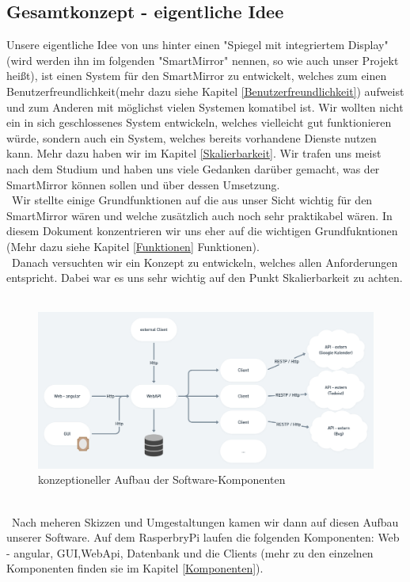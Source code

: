 \subsection{Gesamtkonzept - eigentliche Idee} 
Unsere eigentliche Idee von uns hinter einen "Spiegel mit integriertem Display" (wird werden ihn im folgenden "SmartMirror" nennen, so wie auch unser Projekt heißt), ist einen System für den SmartMirror zu entwickelt, welches zum einen Benutzerfreundlichkeit(mehr dazu siehe Kapitel \ref{Benutzerfreundlichkeit}) aufweist und zum Anderen mit möglichst vielen Systemen komatibel ist. Wir wollten nicht ein in sich geschlossenes System entwickeln, welches vielleicht gut funktionieren würde, sondern auch ein System, welches bereits vorhandene Dienste nutzen kann. Mehr dazu haben wir im Kapitel \ref{Skalierbarkeit}.
Wir trafen uns meist nach dem Studium und haben uns viele Gedanken darüber gemacht, was der SmartMirror können sollen und über dessen Umsetzung. \\\
Wir stellte einige Grundfunktionen auf die aus unser Sicht wichtig für den SmartMirror wären und welche zusätzlich auch noch sehr praktikabel wären. In diesem Dokument konzentrieren wir uns eher auf die wichtigen Grundfukntionen (Mehr dazu siehe Kapitel \ref{Funktionen} Funktionen).\\\
Danach versuchten wir ein Konzept zu entwickeln, welches allen Anforderungen entspricht. Dabei war es uns sehr wichtig auf den Punkt Skalierbarkeit zu achten.\\\
\begin{figure}[h]
\centering
\includegraphics[width=150mm]{pictures/Scalability.png}
\caption{konzeptioneller Aufbau der Software-Komponenten}
\end{figure}\\\
Nach meheren Skizzen und Umgestaltungen kamen wir dann auf diesen Aufbau unserer Software. Auf dem RasperbryPi laufen die folgenden Komponenten: Web - angular, GUI,WebApi, Datenbank und die Clients (mehr zu den einzelnen Komponenten finden sie im Kapitel \ref{Komponenten}). \\\
